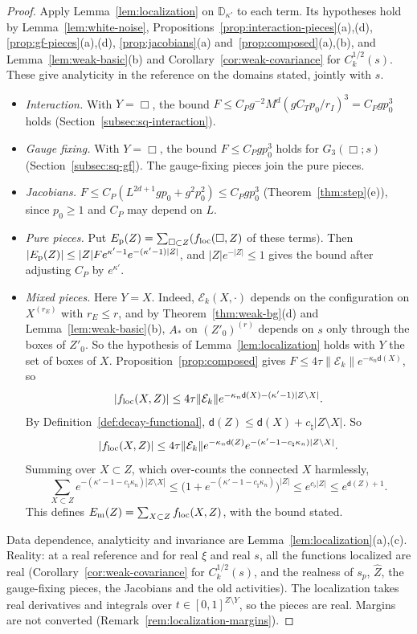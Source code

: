 \begin{proof}
Apply Lemma~\ref{lem:localization} on $\mathbb D_{\kappa'}$ to each term. Its hypotheses hold by Lemma~\ref{lem:white-noise}, Propositions~\ref{prop:interaction-pieces}(a),(d), \ref{prop:gf-pieces}(a),(d), \ref{prop:jacobians}(a) and~\ref{prop:composed}(a),(b), and Lemma~\ref{lem:weak-basic}(b) and Corollary~\ref{cor:weak-covariance} for $C_k^{1/2}(s)$. These give analyticity in the reference on the domains stated, jointly with $s$.
\begin{itemize}
\item \emph{Interaction.} With $Y=\Box$, the bound $F\le C_Pg^{-2}M^d(gC_Tp_0/r_I)^3=C_Pgp_0^3$ holds (Section~\ref{subsec:sq-interaction}).
\item \emph{Gauge fixing.} With $Y=\Box$, the bound $F\le C_Pgp_0^3$ holds for $G_3(\Box;s)$ (Section~\ref{subsec:sq-gf}). The gauge-fixing pieces join the pure pieces.
\item \emph{Jacobians.} $F\le C_P(L^{2d+1}gp_0+g^2p_0^2)\le C_Pgp_0^3$ (Theorem~\ref{thm:step}(e)), since $p_0\ge1$ and $C_P$ may depend on $L$.
\item \emph{Pure pieces.} Put $E_{\rm p}(Z)=\sum_{\Box\subset Z}(f_{\rm loc}(\Box,Z)$ of these terms$)$. Then $|E_{\rm p}(Z)|\le|Z|F e^{\kappa'-1}e^{-(\kappa'-1)|Z|}$, and $|Z|e^{-|Z|}\le1$ gives the bound after adjusting $C_P$ by $e^{\kappa'}$.
\item \emph{Mixed pieces.} Here $Y=X$. Indeed, $\mathcal E_k(X,\cdot)$ depends on the configuration on $X^{(r_E)}$ with $r_E\le r$, and by Theorem~\ref{thm:weak-bg}(d) and Lemma~\ref{lem:weak-basic}(b), $A_*$ on $(Z'_0)^{(r)}$ depends on $s$ only through the boxes of $Z'_0$. So the hypothesis of Lemma~\ref{lem:localization} holds with $Y$ the set of boxes of $X$. Proposition~\ref{prop:composed} gives $F\le4\tau\|\mathcal E_k\|e^{-\kappa_n\mathsf d(X)}$, so
\[
|f_{\rm loc}(X,Z)|\le4\tau\|\mathcal E_k\|e^{-\kappa_n\mathsf d(X)-(\kappa'-1)|Z\setminus X|}.
\]
By Definition~\ref{def:decay-functional}, $\mathsf d(Z)\le\mathsf d(X)+c_\natural|Z\setminus X|$. So
\[
|f_{\rm loc}(X,Z)|\le4\tau\|\mathcal E_k\|e^{-\kappa_n\mathsf d(Z)}e^{-(\kappa'-1-c_\natural\kappa_n)|Z\setminus X|}.
\]
Summing over $X\subset Z$, which over-counts the connected $X$ harmlessly,
\[
\sum_{X\subset Z}e^{-(\kappa'-1-c_\natural\kappa_n)|Z\setminus X|}\le\big(1+e^{-(\kappa'-1-c_\natural\kappa_n)}\big)^{|Z|}\le e^{c_\flat|Z|}\le e^{\mathsf d(Z)+1}.
\]
This defines $E_{\rm m}(Z)=\sum_{X\subset Z}f_{\rm loc}(X,Z)$, with the bound stated.
\end{itemize}
Data dependence, analyticity and invariance are Lemma~\ref{lem:localization}(a),(c). Reality: at a real reference and for real $\xi$ and real $s$, all the functions localized are real (Corollary~\ref{cor:weak-covariance} for $C_k^{1/2}(s)$, and the realness of $s_p$, $\hat Z$, the gauge-fixing pieces, the Jacobians and the old activities). The localization takes real derivatives and integrals over $t\in[0,1]^{Z\setminus Y}$, so the pieces are real. Margins are not converted (Remark~\ref{rem:localization-margins}).
\end{proof}

